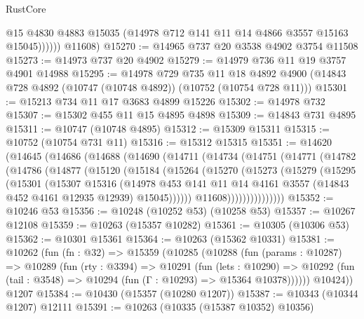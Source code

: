 \begin{lexlean}{RustCore}
\begin{coremodule}
                @15
                @4830
                @4883
                @15035
                (@14978 @712 @141 @11 @14 @4866 @3557 @15163 @15045))))))
      @11608)
@15270 := @14965 @737 @20 @3538 @4902 @3754 @11508
@15273 := @14973 @737 @20 @4902
@15279 := @14979 @736 @11 @19 @3757 @4901 @14988
@15295 := @14978
    @729
    @735
    @11
    @18
    @4892
    @4900
    (@14843 @728 @4892 (@10747 (@10748 @4892)) (@10752 (@10754 @728 @11)))
@15301 := @15213 @734 @11 @17 @3683 @4899 @15226
@15302 := @14978 @732
@15307 := @15302 @455 @11 @15 @4895 @4898
@15309 := @14843 @731 @4895
@15311 := @10747 (@10748 @4895)
@15312 := @15309 @15311
@15315 := @10752 (@10754 @731 @11)
@15316 := @15312 @15315
@15351 := @14620
    (@14645
      (@14686
        (@14688
          (@14690
            (@14711
              (@14734
                (@14751
                  (@14771
                    (@14782
                      (@14786
                        (@14877
                          (@15120
                            (@15184
                              (@15264
                                (@15270
                                  (@15273
                                    (@15279
                                      (@15295
                                        (@15301
                                          (@15307
                                            @15316
                                            (@14978
                                              @453
                                              @141
                                              @11
                                              @14
                                              @4161
                                              @3557
                                              (@14843 @452 @4161 @12935 @12939)
                                              @15045))))))
                                  @11608)))))))))))))))
@15352 := @10246 @53
@15356 := @10248 (@10252 @53) (@10258 @53)
@15357 := @10267 @12108
@15359 := @10263 (@15357 @10282)
@15361 := @10305 (@10306 @53)
@15362 := @10301 @15361
@15364 := @10263 (@15362 @10331)
@15381 := @10262
    (fun (fn : @32) =>
    @15359
      (@10285
        (@10288
          (fun (params : @10287) =>
          @10289
            (fun (rty : @3394) =>
            @10291
              (fun (lets : @10290) =>
              @10292 (fun (tail : @3548) => @10294 (fun (Γ : @10293) => @15364 @10378))))))
        @10424))
    @1207
@15384 := @10430 (@15357 (@10280 @1207))
@15387 := @10343 (@10344 @1207) @12111
@15391 := @10263 (@10335 (@15387 @10352) @10356)

\end{coremodule}
\end{lexlean}
